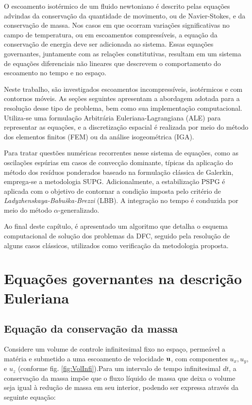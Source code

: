 \documentclass[tese_patricia]{subfiles}%
\begin{document}
O escoamento isotérmico de um fluido newtoniano é descrito pelas equações advindas da conservação da quantidade de movimento, ou de Navier-Stokes, e da conservação de massa. Nos casos em que ocorram variações significativas no campo de temperatura, ou em escoamentos compressíveis, a equação da conservação de energia deve ser adicionada ao sistema. Essas equações governantes, juntamente com as relações constitutivas, resultam em um sistema de equações diferenciais não lineares que descrevem o comportamento do escoamento no tempo e no espaço. 

Neste trabalho, são investigados escoamentos incompressíveis, isotérmicos e com contornos móveis. As seções seguintes apresentam a abordagem adotada para a resolução desse tipo de problema, bem como sua implementação computacional. Utiliza-se uma formulação Arbitrária Euleriana-Lagrangiana (ALE) para representar as equações, e a discretização espacial é realizada por meio do método dos elementos finitos (FEM) ou da análise isogeométrica (IGA).

Para tratar questões numéricas recorrentes nesse sistema de equações, como as oscilações espúrias em casos de convecção dominante, típicas da aplicação do método dos resíduos ponderados baseado na formulação clássica de Galerkin, emprega-se a metodologia SUPG. Adicionalmente, a estabilização PSPG é aplicada com o objetivo de contornar a condição imposta pelo critério de \textit{Ladyzhenskaya-Babuška-Brezzi} (LBB). A integração no tempo é conduzida por meio do método $\alpha$-generalizado.

Ao final deste capítulo, é apresentado um algoritmo que detalha o esquema computacional de solução dos problemas da DFC, seguido pela resolução de alguns casos clássicos, utilizados como verificação da metodologia proposta.


\section{Equações governantes na descrição Euleriana} 


\subsection{Equação da conservação da massa}


Considere um volume de controle infinitesimal fixo no espaço, permeável a matéria e submetido a uma escoamento de velocidade $\mathbf{u}$, com componentes $u_x, u_y$, e $u_z$ (conforme fig. \ref{fig:VolInfi}).Para um intervalo de tempo infinitesimal $dt$, a conservação da massa impõe que o fluxo líquido de massa que deixa o volume seja igual à redução de massa em seu interior, podendo ser expressa através da seguinte equação:
\end{document}
